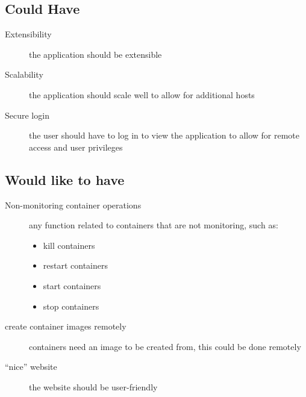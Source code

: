 \subsection{Could Have}
\label{sec:couldhave}
\begin{description}
	\item[Extensibility] the application should be extensible
	\item[Scalability] the application should scale well to allow for additional hosts
	\item[Secure login] the user should have to log in to view the application to allow for remote access and user privileges
\end{description}

\subsection{Would like to have}
\label{sec:wouldhave}
\begin{description}
	\item[Non-monitoring container operations] any function related to containers that are not monitoring, such as:
	\begin{itemize}
		\item kill containers
		\item restart containers
		\item start containers
		\item stop containers
	\end{itemize}
	\item[create container images remotely] containers need an image to be created from, this could be done remotely
	\item[``nice'' website] the website should be user-friendly 
\end{description}